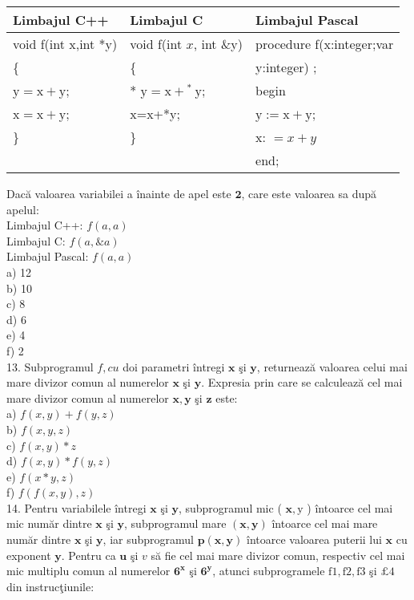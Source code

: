 \begin{center}
\begin{tabular}{|l|l|l|}
\hline
Limbajul C++ & Limbajul C & Limbajul Pascal \\
\hline
void f(int x,int *y) & void f(int $x$, int \&y) & procedure f(x:integer;var \\
\hline
\{ & \{ & y:integer) ; \\
\hline
$\mathrm{y}=\mathrm{x}+\mathrm{y}$; & * $\mathrm{y}=\mathrm{x}+{ }^{\text {* }} \mathrm{y}$; & begin \\
\hline
$\mathrm{x}=\mathrm{x}+\mathrm{y}$; & x=x+*y; & $\mathrm{y}:=\mathrm{x}+\mathrm{y}$; \\
\hline
\} & \} & x: $=x+y$ \\
\hline
 &  & end; \\
\hline
\end{tabular}
\end{center}

Dacă valoarea variabilei a înainte de apel este $\mathbf{2}$, care este valoarea sa după apelul:\\
Limbajul C++: $f(a, a)$\\
Limbajul C: $f(a, \& a)$\\
Limbajul Pascal: $f(a, a)$\\
a) 12\\
b) 10\\
c) 8\\
d) 6\\
e) 4\\
f) 2\\
13. Subprogramul $f, c u$ doi parametri întregi $\mathbf{x}$ şi $\mathbf{y}$, returnează valoarea celui mai mare divizor comun al numerelor $\mathbf{x}$ şi $\mathbf{y}$. Expresia prin care se calculează cel mai mare divizor comun al numerelor $\mathbf{x}, \mathbf{y}$ şi $\mathbf{z}$ este:\\
a) $f(x, y)+f(y, z)$\\
b) $f(x, y, z)$\\
c) $f(x, y) * z$\\
d) $f(x, y) * f(y, z)$\\
e) $f(x * y, z)$\\
f) $f(f(x, y), z)$\\
14. Pentru variabilele întregi $\mathbf{x}$ şi $\mathbf{y}$, subprogramul mic ( $\mathbf{x}, \mathrm{y}$ ) întoarce cel mai mic număr dintre $\mathbf{x}$ şi $\mathbf{y}$, subprogramul mare $(\mathbf{x}, \mathbf{y})$ întoarce cel mai mare număr dintre $\mathbf{x}$ şi $\mathbf{y}$, iar subprogramul $\mathbf{p}(\mathbf{x}, \mathbf{y})$ întoarce valoarea puterii lui $\mathbf{x}$ cu exponent $\mathbf{y}$. Pentru ca $\mathbf{u}$ şi $v$ să fie cel mai mare divizor comun, respectiv cel mai mic multiplu comun al numerelor $\mathbf{6}^{\boldsymbol{x}}$ şi $\mathbf{6}^{\boldsymbol{y}}$, atunci subprogramele $\mathrm{f} 1, \mathrm{f} 2, \mathrm{f} 3$ şi $\pounds 4$ din instrucţiunile:

